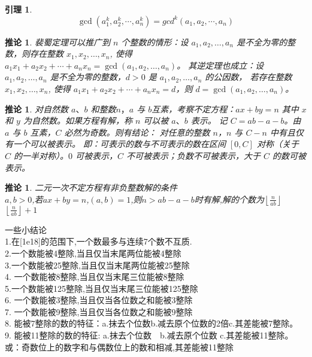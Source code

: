 \documentclass[12pt, a4paper, oneside]{ctexbook}
\newtheorem{lemma}[theorem]{引理}
\newtheorem{corollary}[theorem]{推论}
\newcommand{\newp}[1]{\vspace{#1\baselineskip}\noindent}
\begin{document}
\begin{lemma}
$$
\gcd(a_1^k,a_2^k,\cdots ,a_n^k)=gcd^k(a_1,a_2,\cdots ,a_n)
$$
\end{lemma}


\begin{corollary}
  裴蜀定理可以推广到 $n$ 个整数的情形：设 $a_1, a_2, \dots, a_n$
   是不全为零的整数，则存在整数 $x_1, x_2, \dots, x_n$, 使得 $a_1 x_1 + a_2 x_2 + \cdots + a_n x_n=\gcd(a_1, a_2, \dots, a_n)$。
   其逆定理也成立：设 $a_1, a_2, \dots, a_n$ 是不全为零的整数，$d > 0$ 是 $a_1, a_2, \dots, a_n$ 的公因数，
   若存在整数 $x_1, x_2, \dots, x_n$, 使得 $a_1 x_1 + a_2 x_2 + \cdots + a_n x_n=d$，则 $d = \gcd(a_1, a_2, \dots, a_n)$。
\end{corollary}

\begin{corollary}
  对自然数 $a、b$ 和整数$ n，a$ 与 $b $互素，考察不定方程：$ax+by=n$
 其中 $x$ 和 $y$ 为自然数。如果方程有解，称 $n$ 可以被 $a、b$ 表示。
 记 $C=ab-a-b$。由 $a$ 与 $b$ 互素，$C$ 必然为奇数。则有结论：
对任意的整数 $n$，$n$ 与 $C-n$ 中有且仅有一个可以被表示。
即：可表示的数与不可表示的数在区间 $[0,C]$ 对称（关于 $C$ 的一半对称）。$0$ 可被表示，$C$ 不可被表示；负数不可被表示，大于 $C$ 的数可被表示。
\end{corollary}

\begin{corollary}
  二元一次不定方程有非负整数解的条件\\
  $a,b>0$,若$ax+by=n$,$(a,b)=1$,则$n>ab-a-b$时有解,解的个数为$\left\lfloor \frac{n}{ab} \right\rfloor$
  $\left\lfloor \frac{n}{ab} \right\rfloor+1$ 
\end{corollary}

\newp{3}
一些小结论\\
  1.在[1e18]的范围下,一个数最多与连续7个数不互质.\\
  2.一个数能被4整除,当且仅当末尾两位能被4整除\\
  3.一个数能被25整除,当且仅当末尾两位能被25整除\\
  4. 一个数能被8整除,当且仅当末尾三位能被8整除\\
  5.一个数能被125整除,当且仅当末尾三位能被125整除\\
  6. 一个数能被3整除,当且仅当各位数之和能被3整除\\
  7. 一个数能被9整除,当且仅当各位数之和能被9整除\\
  8. 能被7整除的数的特征：a.抹去个位数b.减去原个位数的2倍c.其差能被7整除。\\
  9. 能被11整除的数的特征: a.抹去个位数　b.减去原个位数 c.其差能被11整除。或：奇数位上的数字和与偶数位上的数和相减,其差能被11整除
\end{document}

